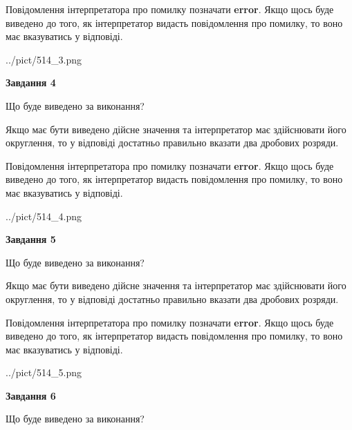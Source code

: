 \documentclass[12pt, ukrainian]{article}
\begin{document}
{\begin {Large}
Повідомлення інтерпретатора про помилку позначати \textbf{error}.
Якщо щось буде виведено до того, як інтерпретатор видасть повідомлення про помилку, 
то воно має вказуватись у відповіді. \par

\begin{center}
	{../pict/514_3.png}
\end{center}
\newpage

{\begin {center}\textbf{Завдання 4}\end {center}}\par
Що буде виведено за виконання? \par

Якщо має бути виведено дійсне значення та інтерпретатор має здійснювати його округлення, 
то у відповіді достатньо правильно вказати два дробових розряди.

Повідомлення інтерпретатора про помилку позначати \textbf{error}.
Якщо щось буде виведено до того, як інтерпретатор видасть повідомлення про помилку, 
то воно має вказуватись у відповіді. \par

\begin{center}
	{../pict/514_4.png}
\end{center}
\newpage

{\begin {center}\textbf{Завдання 5}\end {center}}\par
Що буде виведено за виконання? \par

Якщо має бути виведено дійсне значення та інтерпретатор має здійснювати його округлення, 
то у відповіді достатньо правильно вказати два дробових розряди.

Повідомлення інтерпретатора про помилку позначати \textbf{error}.
Якщо щось буде виведено до того, як інтерпретатор видасть повідомлення про помилку, 
то воно має вказуватись у відповіді. \par

\begin{center}
	{../pict/514_5.png}
\end{center}
\newpage

{\begin {center}\textbf{Завдання 6}\end {center}}\par
Що буде виведено за виконання? \par


\end{Large}}
\end{document}
